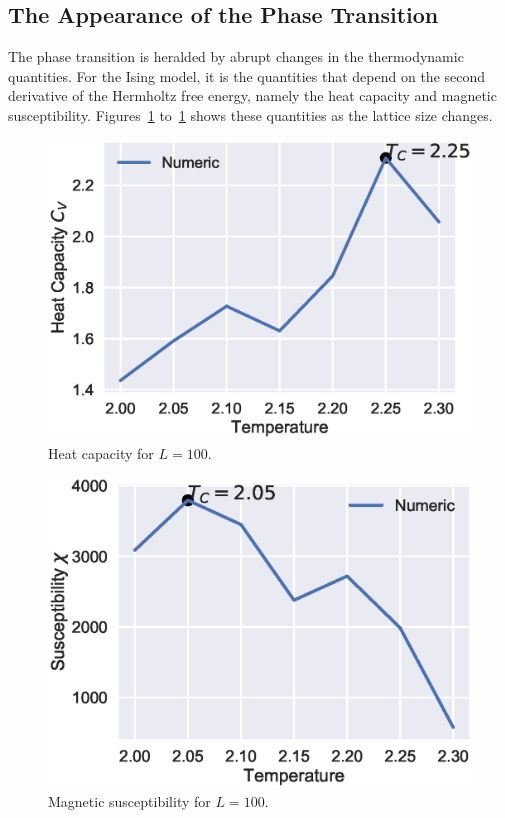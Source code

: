\documentclass[aps,reprint]{revtex4-1}
\begin{document}
\subsection{The Appearance of the Phase Transition}
\label{sec:appe-phase-trans}

The phase transition is heralded by abrupt changes in the thermodynamic
quantities. For the Ising model, it is the quantities that depend on the second
derivative of the Hermholtz free energy, namely the heat capacity and magnetic
susceptibility. Figures~\ref{fig:100CVTc} to~\ref{fig:100CVTc} shows these
quantities as the lattice size changes.

\begin{figure}[H]
  \centering
  \includegraphics[width=\columnwidth]{figures/L100Cv.eps}
  \caption{\label{fig:100CVTc} Heat capacity for \(L=100\).}
\end{figure}

\begin{figure}[H]
  \centering
  \includegraphics[width=\columnwidth]{figures/L100sus.eps}
  \caption{\label{fig:100sus} Magnetic susceptibility for \(L=100\).}
\end{figure}
\end{document}
